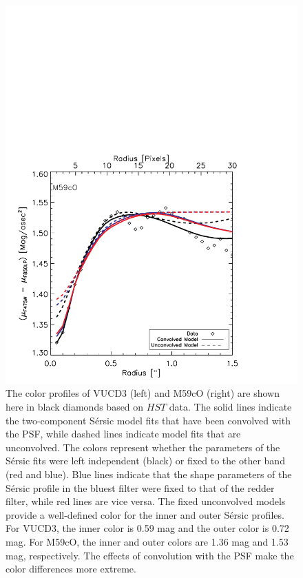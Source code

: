 \documentclass{aastex}
\begin{document}
\begin{figure}[ht!]
\begin{minipage}{0.48\textwidth}
  \end{minipage}
  \begin{minipage}{0.48\textwidth}
    \includegraphics[trim={0 0 0 10cm},clip,scale=0.5]{m59co_color.pdf}%
  \end{minipage}
  \caption{The color profiles of VUCD3 (left) and M59cO (right) are shown here in black diamonds based on $HST$ data. The solid lines indicate the two-component S\'ersic model fits that have been convolved with the PSF, while dashed lines indicate model fits that are unconvolved. The colors represent whether the parameters of the S\'ersic fits were left independent (black) or fixed to the other band (red and blue). Blue lines indicate that the shape parameters of the S\'ersic profile in the bluest filter were fixed to that of the redder filter, while red lines are vice versa. The fixed unconvolved models provide a well-defined color for the inner and outer S\'ersic profiles. For VUCD3, the inner color is 0.59 mag and the outer color is 0.72 mag. For M59cO, the inner and outer colors are 1.36 mag and 1.53 mag, respectively. The effects of convolution with the PSF make the color differences more extreme.}
  
  \label{fig:color}
\end{figure}
\end{document}
